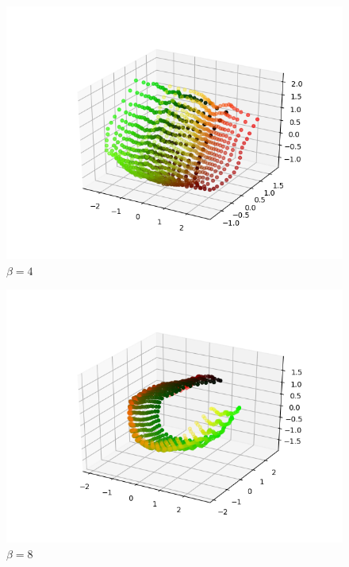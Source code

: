 \begin{figure}[h!]
\begin{center}
 
  \includegraphics[width=\linewidth]{metrics/3D-b4.png}
  \caption{$\beta=4$} \label{3D-b4}
\end{center}
\end{figure}
\begin{figure}[h!]
\begin{center}
 
  \includegraphics[width=\linewidth]{metrics/3D-b6.png}
  \caption{$\beta=8$} \label{3D-b8}
\end{center}
\end{figure}

